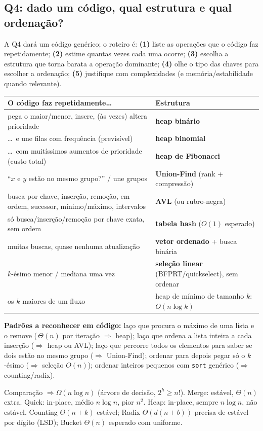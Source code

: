 \subsection{Q4: dado um código, qual estrutura e qual ordenação?}\label{sec:escolhageral}
A Q4 dará um código genérico; o roteiro é: \textbf{(1)} liste as operações que o código faz repetidamente; \textbf{(2)} estime quantas vezes cada uma ocorre; \textbf{(3)} escolha a estrutura que torna barata a operação dominante; \textbf{(4)} olhe o tipo das chaves para escolher a ordenação; \textbf{(5)} justifique com complexidades (e memória/estabilidade quando relevante).
\begin{center}
\small
\begin{tabularx}{\linewidth}{@{}XX@{}}
\toprule
O código faz repetidamente\dots & Estrutura\\
\midrule
pega o maior/menor, insere, (às vezes) altera prioridade & \textbf{heap binário}\\
\dots\ e une filas com frequência (previsível) & \textbf{heap binomial}\\
\dots\ com muitíssimos aumentos de prioridade (custo total) & \textbf{heap de Fibonacci}\\
``$x$ e $y$ estão no mesmo grupo?'' / une grupos & \textbf{Union-Find} (rank + compressão)\\
busca por chave, inserção, remoção, em ordem, sucessor, mínimo/máximo, intervalos & \textbf{AVL} (ou rubro-negra)\\
só busca/inserção/remoção por chave exata, sem ordem & \textbf{tabela hash} ($O(1)$ esperado)\\
muitas buscas, quase nenhuma atualização & \textbf{vetor ordenado} + busca binária\\
$k$-ésimo menor / mediana uma vez & \textbf{seleção linear} (BFPRT/quickselect), sem ordenar\\
os $k$ maiores de um fluxo & heap de mínimo de tamanho $k$: $O(n\log k)$\\
\bottomrule
\end{tabularx}
\end{center}
\textbf{Padrões a reconhecer em código:} laço que procura o máximo de uma lista e o remove (\,$\Theta(n)$ por iteração $\Rightarrow$ heap); laço que ordena a lista inteira a cada inserção ($\Rightarrow$ heap ou AVL); laço que percorre todos os elementos para saber se dois estão no mesmo grupo ($\Rightarrow$ Union-Find); ordenar para depois pegar só o $k$-ésimo ($\Rightarrow$ seleção $O(n)$); ordenar inteiros pequenos com \texttt{sort} genérico ($\Rightarrow$ counting/radix).

\begin{chave}
Comparação $\Rightarrow\Omega(n\log n)$ (árvore de decisão, $2^h\ge n!$). Merge: estável, $\Theta(n)$ extra. Quick: in-place, médio $n\log n$, pior $n^2$. Heap: in-place, sempre $n\log n$, não estável. Counting $\Theta(n+k)$ estável; Radix $\Theta(d(n+b))$ precisa de estável por dígito (LSD); Bucket $\Theta(n)$ esperado com uniforme.
\end{chave}
